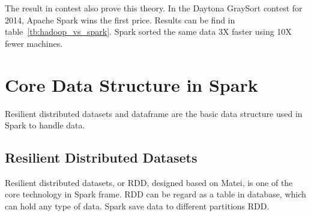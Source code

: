 The result in contest also prove this theory. In the Daytona GraySort contest for 2014, Apache Spark wins the first price\cite{3_xin_2014}. Results can be find in table~\ref{tb:hadoop_vs_spark}. Spark sorted the same data 3X faster using 10X fewer machines.
\begin{table}[h]
	\centering
	\caption{Spark TeraSort vs MapReduce\cite{3_xin_2014}}
	\label{tb:hadoop_vs_spark}
\end{table}


\section{Core Data Structure in Spark}

Resilient distributed datasets and dataframe are the basic data structure used in Spark to handle data.\\

\subsection{Resilient Distributed Datasets}

Resilient distributed datasets, or RDD, designed based on Matei\cite{zaharia2012resilient}, is one of the core technology in Spark frame. RDD can be regard as a table in database, which can hold any type of data. Spark save data to different partitions RDD.\\


